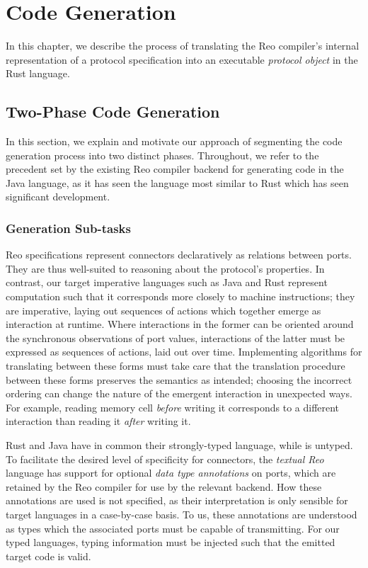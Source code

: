 \chapter{Code Generation}
\label{sec:imperative_form}
In this chapter, we describe the process of translating the Reo compiler's internal representation of a protocol specification into an executable \textit{protocol object} in the Rust language.

\section{Two-Phase Code Generation}
In this section, we explain and motivate our approach of segmenting the code generation process into two distinct phases. Throughout, we refer to the precedent set by the existing Reo compiler backend for generating code in the Java language, as it has seen the language most similar to Rust which has seen significant development.   

\subsection{Generation Sub-tasks}
Reo specifications represent connectors declaratively as relations between ports. They are thus well-suited to reasoning about the protocol's properties. In contrast, our target imperative languages such as Java and Rust represent computation such that it corresponds more closely to machine instructions; they are imperative, laying out sequences of actions which together emerge as interaction at runtime. Where interactions in the former can be oriented around the synchronous observations of port values, interactions of the latter must be expressed as sequences of actions, laid out over time. Implementing algorithms for translating between these forms must take care that the translation procedure between these forms preserves the semantics as intended; choosing the incorrect ordering can change the nature of the emergent interaction in unexpected ways. For example, reading memory cell \textit{before} writing it corresponds to a different interaction than reading it \textit{after} writing it. 

Rust and Java have in common their strongly-typed language, while  is untyped. To facilitate the desired level of specificity for connectors, the \textit{textual Reo} language has support for optional \textit{data type annotations} on ports, which are retained by the Reo compiler for use by the relevant backend. How these annotations are used is not specified, as their interpretation is only sensible for target languages in a case-by-case basis. To us, these annotations are understood as types which the associated ports must be capable of transmitting. For our typed languages, typing information must be injected such that the emitted target code is valid.

